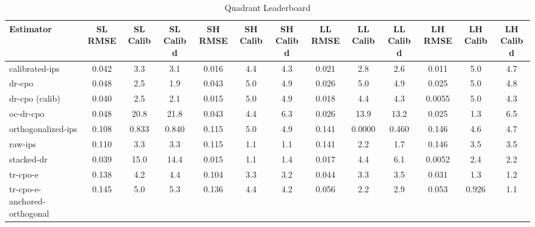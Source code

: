 \begin{table}[htbp]
\centering
\caption{Quadrant Leaderboard}
\label{tab:A1}
\begin{tabular}{l|cccccccccccc}
\toprule
Estimator & SL RMSE & SL Calib & SL Calib d & SH RMSE & SH Calib & SH Calib d & LL RMSE & LL Calib & LL Calib d & LH RMSE & LH Calib & LH Calib d \\
\midrule
calibrated-ips & 0.042 & 3.3 & 3.1 & 0.016 & 4.4 & 4.3 & 0.021 & 2.8 & 2.6 & 0.011 & 5.0 & 4.7 \\
dr-cpo & 0.048 & 2.5 & 1.9 & 0.043 & 5.0 & 4.9 & 0.026 & 5.0 & 4.9 & 0.025 & 5.0 & 4.8 \\
dr-cpo (calib) & 0.040 & 2.5 & 2.1 & 0.015 & 5.0 & 4.9 & 0.018 & 4.4 & 4.3 & 0.0055 & 5.0 & 4.3 \\
oc-dr-cpo & 0.048 & 20.8 & 21.8 & 0.043 & 4.4 & 6.3 & 0.026 & 13.9 & 13.2 & 0.025 & 1.3 & 6.5 \\
orthogonalized-ips & 0.108 & 0.833 & 0.840 & 0.115 & 5.0 & 4.9 & 0.141 & 0.0000 & 0.460 & 0.146 & 4.6 & 4.7 \\
raw-ips & 0.110 & 3.3 & 3.3 & 0.115 & 1.1 & 1.1 & 0.141 & 2.2 & 1.7 & 0.146 & 3.5 & 3.5 \\
stacked-dr & 0.039 & 15.0 & 14.4 & 0.015 & 1.1 & 1.4 & 0.017 & 4.4 & 6.1 & 0.0052 & 2.4 & 2.2 \\
tr-cpo-e & 0.138 & 4.2 & 4.4 & 0.104 & 3.3 & 3.2 & 0.044 & 3.3 & 3.5 & 0.031 & 1.3 & 1.2 \\
tr-cpo-e-anchored-orthogonal & 0.145 & 5.0 & 5.3 & 0.136 & 4.4 & 4.2 & 0.056 & 2.2 & 2.9 & 0.053 & 0.926 & 1.1 \\
\bottomrule
\end{tabular}
\end{table}